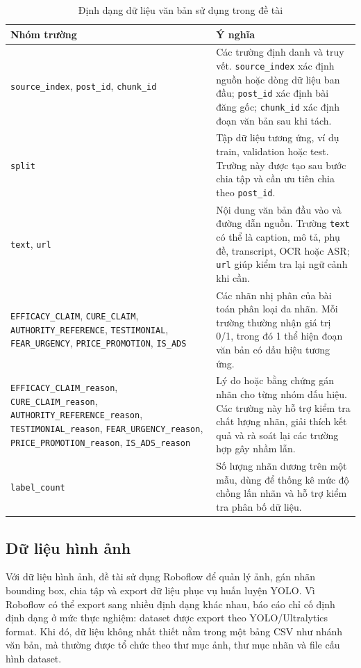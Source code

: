 \begin{table}[H]
\centering
\caption{Định dạng dữ liệu văn bản sử dụng trong đề tài}
\label{tab:text_data_format}
\begin{tabularx}{\textwidth}{|L{0.36\textwidth}|Y|}
\hline
\textbf{Nhóm trường} & \textbf{Ý nghĩa} \\
\hline
\texttt{source\_index}, \texttt{post\_id}, \texttt{chunk\_id} & Các trường định danh và truy vết. \texttt{source\_index} xác định nguồn hoặc dòng dữ liệu ban đầu; \texttt{post\_id} xác định bài đăng gốc; \texttt{chunk\_id} xác định đoạn văn bản sau khi tách. \\ \hline
\texttt{split} & Tập dữ liệu tương ứng, ví dụ train, validation hoặc test. Trường này được tạo sau bước chia tập và cần ưu tiên chia theo \texttt{post\_id}. \\ \hline
\texttt{text}, \texttt{url} & Nội dung văn bản đầu vào và đường dẫn nguồn. Trường \texttt{text} có thể là caption, mô tả, phụ đề, transcript, OCR hoặc ASR; \texttt{url} giúp kiểm tra lại ngữ cảnh khi cần. \\ \hline
\texttt{EFFICACY\_CLAIM}, \texttt{CURE\_CLAIM}, \texttt{AUTHORITY\_REFERENCE}, \texttt{TESTIMONIAL}, \texttt{FEAR\_URGENCY}, \texttt{PRICE\_PROMOTION}, \texttt{IS\_ADS} & Các nhãn nhị phân của bài toán phân loại đa nhãn. Mỗi trường thường nhận giá trị 0/1, trong đó 1 thể hiện đoạn văn bản có dấu hiệu tương ứng. \\ \hline
\texttt{EFFICACY\_CLAIM\_reason}, \texttt{CURE\_CLAIM\_reason}, \texttt{AUTHORITY\_REFERENCE\_reason}, \texttt{TESTIMONIAL\_reason}, \texttt{FEAR\_URGENCY\_reason}, \texttt{PRICE\_PROMOTION\_reason}, \texttt{IS\_ADS\_reason} & Lý do hoặc bằng chứng gán nhãn cho từng nhóm dấu hiệu. Các trường này hỗ trợ kiểm tra chất lượng nhãn, giải thích kết quả và rà soát lại các trường hợp gây nhầm lẫn. \\ \hline
\texttt{label\_count} & Số lượng nhãn dương trên một mẫu, dùng để thống kê mức độ chồng lấn nhãn và hỗ trợ kiểm tra phân bố dữ liệu. \\ \hline
\end{tabularx}
\end{table}

\subsection{Dữ liệu hình ảnh}
Với dữ liệu hình ảnh, đề tài sử dụng Roboflow để quản lý ảnh, gán nhãn bounding box, chia tập và export dữ liệu phục vụ huấn luyện YOLO. Vì Roboflow có thể export sang nhiều định dạng khác nhau, báo cáo chỉ cố định định dạng ở mức thực nghiệm: dataset được export theo YOLO/Ultralytics format. Khi đó, dữ liệu không nhất thiết nằm trong một bảng CSV như nhánh văn bản, mà thường được tổ chức theo thư mục ảnh, thư mục nhãn và file cấu hình dataset.

